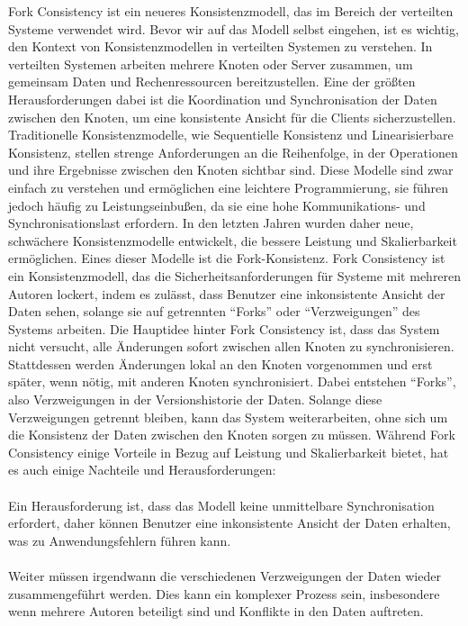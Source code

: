 Fork Consistency ist ein neueres Konsistenzmodell, das im Bereich der verteilten Systeme verwendet wird. Bevor wir auf das Modell selbst eingehen, ist es wichtig, den Kontext von Konsistenzmodellen in verteilten Systemen zu verstehen. In verteilten Systemen arbeiten mehrere Knoten oder Server zusammen, um gemeinsam Daten und Rechenressourcen bereitzustellen. Eine der größten Herausforderungen dabei ist die Koordination und Synchronisation der Daten zwischen den Knoten, um eine konsistente Ansicht für die Clients sicherzustellen.
Traditionelle Konsistenzmodelle, wie Sequentielle Konsistenz und Linearisierbare Konsistenz, stellen strenge Anforderungen an die Reihenfolge, in der Operationen und ihre Ergebnisse zwischen den Knoten sichtbar sind. Diese Modelle sind zwar einfach zu verstehen und ermöglichen eine leichtere Programmierung, sie führen jedoch häufig zu Leistungseinbußen, da sie eine hohe Kommunikations- und Synchronisationslast erfordern.
In den letzten Jahren wurden daher neue, schwächere Konsistenzmodelle entwickelt, die bessere Leistung und Skalierbarkeit ermöglichen. Eines dieser Modelle ist die Fork-Konsistenz. Fork Consistency ist ein Konsistenzmodell, das die Sicherheitsanforderungen für Systeme mit mehreren Autoren lockert, indem es zulässt, dass Benutzer eine inkonsistente Ansicht der Daten sehen, solange sie auf getrennten \enquote{Forks} oder \enquote{Verzweigungen} des Systems arbeiten.
Die Hauptidee hinter Fork Consistency ist, dass das System nicht versucht, alle Änderungen sofort zwischen allen Knoten zu synchronisieren. Stattdessen werden Änderungen lokal an den Knoten vorgenommen und erst später, wenn nötig, mit anderen Knoten synchronisiert. Dabei entstehen \enquote{Forks}, also Verzweigungen in der Versionshistorie der Daten. Solange diese Verzweigungen getrennt bleiben, kann das System weiterarbeiten, ohne sich um die Konsistenz der Daten zwischen den Knoten sorgen zu müssen.
Während Fork Consistency einige Vorteile in Bezug auf Leistung und Skalierbarkeit bietet, hat es auch einige Nachteile und Herausforderungen:
\\\\
Ein Herausforderung ist, dass das Modell keine unmittelbare Synchronisation erfordert, daher können Benutzer eine inkonsistente Ansicht der Daten erhalten, was zu Anwendungsfehlern führen kann.
\\\\
Weiter müssen irgendwann die verschiedenen Verzweigungen der Daten wieder zusammengeführt werden. Dies kann ein komplexer Prozess sein, insbesondere wenn mehrere Autoren beteiligt sind und Konflikte in den Daten auftreten.
